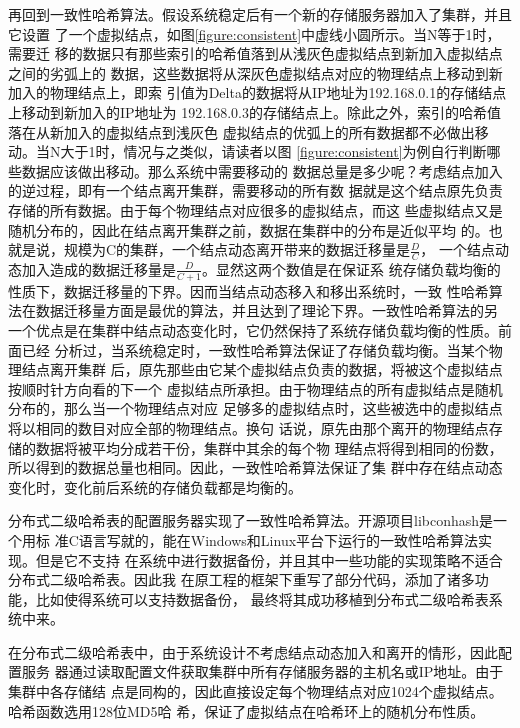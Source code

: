 再回到一致性哈希算法。假设系统稳定后有一个新的存储服务器加入了集群，并且它设置
了一个虚拟结点，如图\ref{figure:consistent}中虚线小圆所示。当N等于1时，需要迁
移的数据只有那些索引的哈希值落到从浅灰色虚拟结点到新加入虚拟结点之间的劣弧上的
数据，这些数据将从深灰色虚拟结点对应的物理结点上移动到新加入的物理结点上，即索
引值为Delta的数据将从IP地址为192.168.0.1的存储结点上移动到新加入的IP地址为
192.168.0.3的存储结点上。除此之外，索引的哈希值落在从新加入的虚拟结点到浅灰色
虚拟结点的优弧上的所有数据都不必做出移动。当N大于1时，情况与之类似，请读者以图
\ref{figure:consistent}为例自行判断哪些数据应该做出移动。那么系统中需要移动的
数据总量是多少呢？考虑结点加入的逆过程，即有一个结点离开集群，需要移动的所有数
据就是这个结点原先负责存储的所有数据。由于每个物理结点对应很多的虚拟结点，而这
些虚拟结点又是随机分布的，因此在结点离开集群之前，数据在集群中的分布是近似平均
的。也就是说，规模为C的集群，一个结点动态离开带来的数据迁移量是$\frac{D}{C}$，
一个结点动态加入造成的数据迁移量是$\frac{D}{C + 1}$。显然这两个数值是在保证系
统存储负载均衡的性质下，数据迁移量的下界。因而当结点动态移入和移出系统时，一致
性哈希算法在数据迁移量方面是最优的算法，并且达到了理论下界。一致性哈希算法的另
一个优点是在集群中结点动态变化时，它仍然保持了系统存储负载均衡的性质。前面已经
分析过，当系统稳定时，一致性哈希算法保证了存储负载均衡。当某个物理结点离开集群
后，原先那些由它某个虚拟结点负责的数据，将被这个虚拟结点按顺时针方向看的下一个
虚拟结点所承担。由于物理结点的所有虚拟结点是随机分布的，那么当一个物理结点对应
足够多的虚拟结点时，这些被选中的虚拟结点将以相同的数目对应全部的物理结点。换句
话说，原先由那个离开的物理结点存储的数据将被平均分成若干份，集群中其余的每个物
理结点将得到相同的份数，所以得到的数据总量也相同。因此，一致性哈希算法保证了集
群中存在结点动态变化时，变化前后系统的存储负载都是均衡的。

分布式二级哈希表的配置服务器实现了一致性哈希算法。开源项目libconhash是一个用标
准C语言写就的，能在Windows和Linux平台下运行的一致性哈希算法实现。但是它不支持
在系统中进行数据备份，并且其中一些功能的实现策略不适合分布式二级哈希表。因此我
在原工程的框架下重写了部分代码，添加了诸多功能，比如使得系统可以支持数据备份，
最终将其成功移植到分布式二级哈希表系统中来。

在分布式二级哈希表中，由于系统设计不考虑结点动态加入和离开的情形，因此配置服务
器通过读取配置文件获取集群中所有存储服务器的主机名或IP地址。由于集群中各存储结
点是同构的，因此直接设定每个物理结点对应1024个虚拟结点。哈希函数选用128位MD5哈
希\cite{rivest1992rfc1321}，保证了虚拟结点在哈希环上的随机分布性质。

